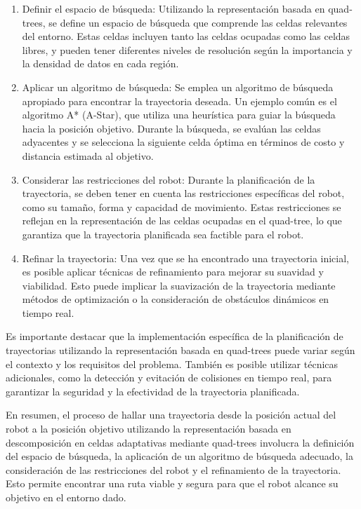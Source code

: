 \documentclass{article}
\begin{document}
\begin{itemize}
  \begin{enumerate}
  \item Definir el espacio de búsqueda: Utilizando la representación basada en quad-trees, se define un espacio de búsqueda que comprende las celdas relevantes del entorno. Estas celdas incluyen tanto las celdas ocupadas como las celdas libres, y pueden tener diferentes niveles de resolución según la importancia y la densidad de datos en cada región.
  \item Aplicar un algoritmo de búsqueda: Se emplea un algoritmo de búsqueda apropiado para encontrar la trayectoria deseada. Un ejemplo común es el algoritmo A* (A-Star), que utiliza una heurística para guiar la búsqueda hacia la posición objetivo. Durante la búsqueda, se evalúan las celdas adyacentes y se selecciona la siguiente celda óptima en términos de costo y distancia estimada al objetivo.
  \item Considerar las restricciones del robot: Durante la planificación de la trayectoria, se deben tener en cuenta las restricciones específicas del robot, como su tamaño, forma y capacidad de movimiento. Estas restricciones se reflejan en la representación de las celdas ocupadas en el quad-tree, lo que garantiza que la trayectoria planificada sea factible para el robot.
  \item Refinar la trayectoria: Una vez que se ha encontrado una trayectoria inicial, es posible aplicar técnicas de refinamiento para mejorar su suavidad y viabilidad. Esto puede implicar la suavización de la trayectoria mediante métodos de optimización o la consideración de obstáculos dinámicos en tiempo real.
  \end{enumerate}

  Es importante destacar que la implementación específica de la planificación de trayectorias utilizando la representación basada en quad-trees puede variar según el contexto y los requisitos del problema. También es posible utilizar técnicas adicionales, como la detección y evitación de colisiones en tiempo real, para garantizar la seguridad y la efectividad de la trayectoria planificada.

En resumen, el proceso de hallar una trayectoria desde la posición actual del robot a la posición objetivo utilizando la representación basada en descomposición en celdas adaptativas mediante quad-trees involucra la definición del espacio de búsqueda, la aplicación de un algoritmo de búsqueda adecuado, la consideración de las restricciones del robot y el refinamiento de la trayectoria. Esto permite encontrar una ruta viable y segura para que el robot alcance su objetivo en el entorno dado.
  
\end{itemize}

\end{document}
